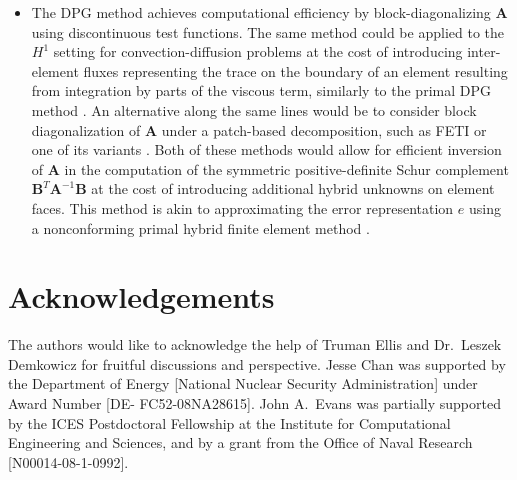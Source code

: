 \documentclass[final,leqno]{siamltex}
\newcommand{\bs}[1]{\boldsymbol{#1}}
\begin{document}
\begin{itemize}
\item The DPG method achieves computational efficiency by block-diagonalizing $\bs{A}$ using discontinuous test functions.  The same method could be applied to the $H^1$ setting for convection-diffusion problems at the cost of introducing inter-element fluxes representing the trace on the boundary of an element resulting from integration by parts of the viscous term, similarly to the primal DPG method \cite{primalDPG}.  An alternative along the same lines would be to consider block diagonalization of $\bs{A}$ under a patch-based decomposition, such as FETI or one of its variants \cite{FETI1,FETI2}.  Both of these methods would allow for efficient inversion of $\bs{A}$ in the computation of the symmetric positive-definite Schur complement $\bs{B}^T \bs{A}^{-1} \bs{B}$ at the cost of introducing additional hybrid unknowns on element faces.  This method is akin to approximating the error representation $e$ using a nonconforming primal hybrid finite element method \cite{raviart1977primal}.  
\end{itemize}

\section{Acknowledgements}

The authors would like to acknowledge the help of Truman Ellis and Dr.\ Leszek Demkowicz for fruitful discussions and perspective.  Jesse Chan was supported by the Department of Energy [National Nuclear Security Administration] under Award Number [DE- FC52-08NA28615].  John A.\ Evans was partially supported by the ICES Postdoctoral Fellowship at the Institute for Computational Engineering and Sciences, and by a grant from the Office of Naval Research [N00014-08-1-0992].



\end{document}
